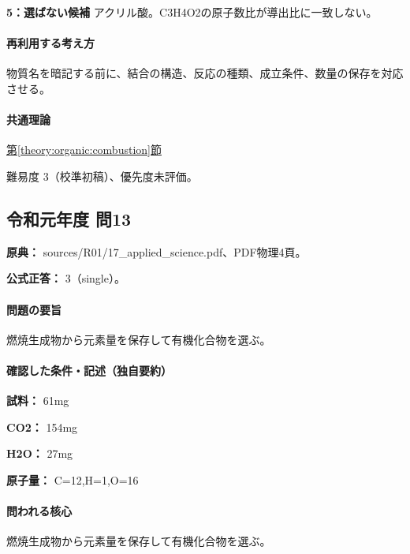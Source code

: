 \noindent\textbf{5：選ばない候補} アクリル酸。C3H4O2の原子数比が導出比に一致しない。\par

\paragraph{再利用する考え方} 物質名を暗記する前に、結合の構造、反応の種類、成立条件、数量の保存を対応させる。

\paragraph{共通理論} \hyperref[theory:organic:combustion]{第\ref*{theory:organic:combustion}節}

\par 難易度 3（校準初稿）、優先度未評価。

\subsection{令和元年度 問13}
\label{q:r01-reg-applied-13}

\noindent\textbf{原典：} sources/R01/17\_applied\_science.pdf、PDF物理4頁。

\textbf{公式正答：} 3（single）。

\paragraph{問題の要旨} 燃焼生成物から元素量を保存して有機化合物を選ぶ。

\paragraph{確認した条件・記述（独自要約）}\mbox{}\par

\noindent\textbf{試料：} 61mg\par

\noindent\textbf{CO2：} 154mg\par

\noindent\textbf{H2O：} 27mg\par

\noindent\textbf{原子量：} C=\allowbreak{}12,H=\allowbreak{}1,O=\allowbreak{}16\par

\paragraph{問われる核心} 燃焼生成物から元素量を保存して有機化合物を選ぶ。

